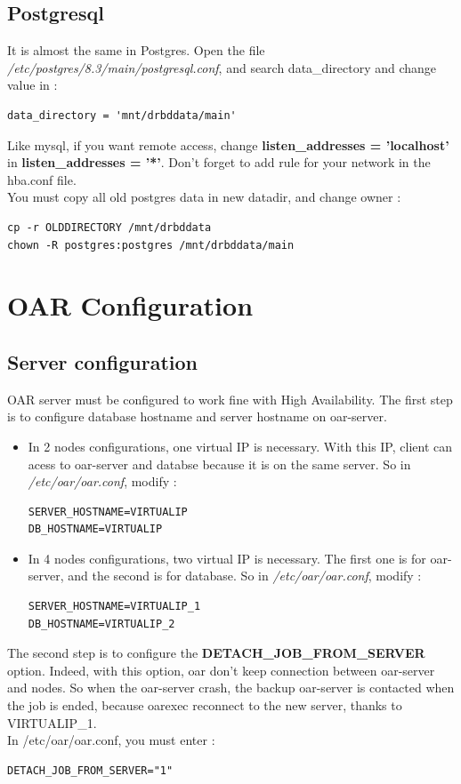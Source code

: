 \documentclass[a4paper,10pt]{report}
\begin{document}
\subsection{Postgresql}
It is almost the same in Postgres. Open the file \textit{/etc/postgres/8.3/main/postgresql.conf}, and search data\_directory and change value in :
\begin{lstlisting}
data_directory = 'mnt/drbddata/main'
\end{lstlisting}
Like mysql, if you want remote access, change \textbf{listen\_addresses = 'localhost'} in \textbf{listen\_addresses = '*'}. Don't forget to add rule for your network in the hba.conf file.\\
You must copy all old postgres data in new datadir, and change owner :
\begin{lstlisting}
cp -r OLDDIRECTORY /mnt/drbddata
chown -R postgres:postgres /mnt/drbddata/main
\end{lstlisting}



\section{OAR Configuration}
\subsection{Server configuration}
OAR server must be configured to work fine with High Availability. The first step is to configure database hostname and server hostname on oar-server.
\begin{itemize}
 \item In 2 nodes configurations, one virtual IP is necessary. With this IP, client can acess to oar-server and databse because it is on the same server.
So in \textit{/etc/oar/oar.conf}, modify :
\begin{lstlisting}
SERVER_HOSTNAME=VIRTUALIP
DB_HOSTNAME=VIRTUALIP
\end{lstlisting}
\item In 4 nodes configurations, two virtual IP is necessary. The first one is for oar-server, and the second is for database.
So in \textit{/etc/oar/oar.conf}, modify :
\begin{lstlisting}
SERVER_HOSTNAME=VIRTUALIP_1
DB_HOSTNAME=VIRTUALIP_2
\end{lstlisting}

\end{itemize}


The second step is to configure the \textbf{DETACH\_JOB\_FROM\_SERVER} option. Indeed, with this option, oar don't keep connection between oar-server and nodes.
So when the oar-server crash, the backup oar-server is contacted when the job is ended, because oarexec reconnect to the new server, thanks to VIRTUALIP\_1.\\
In /etc/oar/oar.conf, you must enter :
\begin{lstlisting}
DETACH_JOB_FROM_SERVER="1"
\end{lstlisting}
\end{document}
